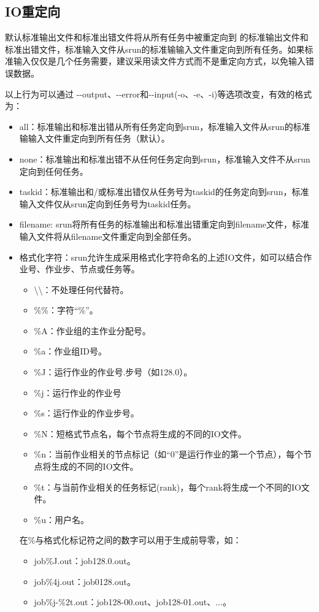 \subsection{IO重定向}\label{slurmio}
默认标准输出文件和标准出错文件将从所有任务中被重定向到 的标准输出文件和标准出错文件，标准输入文件从srun的标准输输入文件重定向到所有任务。如果标准输入仅仅是几个任务需要，建议采用读文件方式而不是重定向方式，以免输入错误数据。

以上行为可以通过 -{}-output、-{}-error和-{}-input(-o、-e、-i)等选项改变，有效的格式为：
\begin{itemize}
	\item all：标准输出和标准出错从所有任务定向到srun，标准输入文件从srun的标准输输入文件重定向到所有任务（默认）。
    \item none：标准输出和标准出错不从任何任务定向到srun，标准输入文件不从srun定向到任何任务。
    \item taskid：标准输出和/或标准出错仅从任务号为taskid的任务定向到srun，标准输入文件仅从srun定向到任务号为taskid任务。
    \item filename: srun将所有任务的标准输出和标准出错重定向到filename文件，标准输入文件将从filename文件重定向到全部任务。
    \item 格式化字符：srun允许生成采用格式化字符命名的上述IO文件，如可以结合作业号、作业步、节点或任务等。
\begin{itemize}
	\item \textbackslash\textbackslash：不处理任何代替符。
    \item \%\%：字符``\%''。
    \item \%A：作业组的主作业分配号。
    \item \%a：作业组ID号。
    \item \%J：运行作业的作业号.步号（如128.0）。
    \item \%j：运行作业的作业号
    \item \%s：运行作业的作业步号。
    \item \%N：短格式节点名，每个节点将生成的不同的IO文件。
    \item \%n：当前作业相关的节点标记（如``0''是运行作业的第一个节点），每个节点将生成的不同的IO文件。
    \item \%t：与当前作业相关的任务标记(rank)，每个rank将生成一个不同的IO文件。
    \item \%u：用户名。
\end{itemize}
在\%与格式化标记符之间的数字可以用于生成前导零，如：
\begin{itemize}
   \item job\%J.out：job128.0.out。
   \item job\%4j.out：job0128.out。
   \item job\%j-\%2t.out：job128-00.out、job128-01.out、...。
\end{itemize}
\end{itemize}

